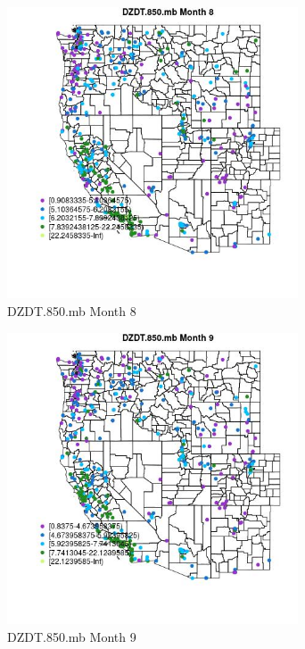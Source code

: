 \clearpage 

\begin{figure} 
\centering  
\includegraphics[width=0.77\textwidth]{Code_Outputs/ML_input_report_ML_input_PM25_Step5_part_d_de_duplicated_aves_ML_input_MapObsMo8DZDT850mb.jpg} 
\caption{\label{fig:ML_input_report_ML_input_PM25_Step5_part_d_de_duplicated_aves_ML_inputMapObsMo8DZDT850mb}DZDT.850.mb Month 8} 
\end{figure} 
 

\begin{figure} 
\centering  
\includegraphics[width=0.77\textwidth]{Code_Outputs/ML_input_report_ML_input_PM25_Step5_part_d_de_duplicated_aves_ML_input_MapObsMo9DZDT850mb.jpg} 
\caption{\label{fig:ML_input_report_ML_input_PM25_Step5_part_d_de_duplicated_aves_ML_inputMapObsMo9DZDT850mb}DZDT.850.mb Month 9} 
\end{figure} 
 

